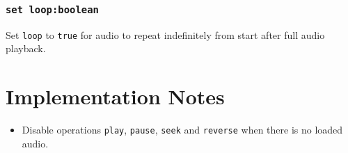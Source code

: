 \documentclass[20pt]{article}
\begin{document}
\subsubsection*{\texttt{set loop:boolean}}
Set \texttt{loop} to \texttt{true} for audio to repeat indefinitely from start after full audio playback.

\section*{Implementation Notes}
\begin{itemize}
\item Disable operations \texttt{play}, \texttt{pause}, \texttt{seek} and \texttt{reverse} when there is no loaded audio.
\end{itemize}
\end{document}
